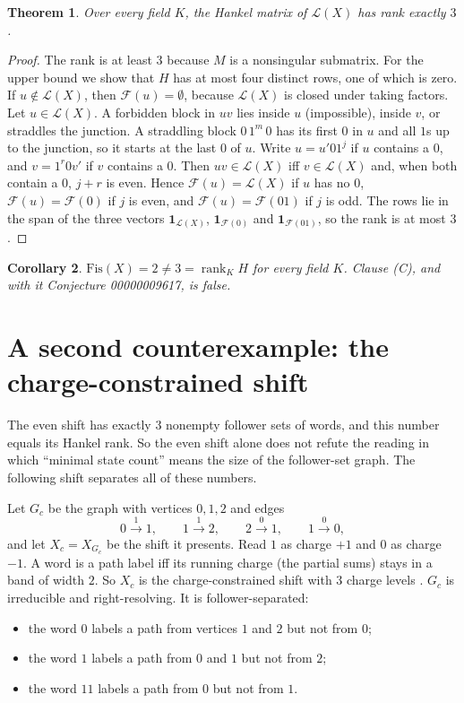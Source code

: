 \documentclass[11pt]{article}
\newtheorem{theorem}{Theorem}
\newtheorem{corollary}[theorem]{Corollary}
\theoremstyle{definition}
\theoremstyle{remark}
\newcommand{\Lang}{\mathcal{L}}
\newcommand{\F}{\mathcal{F}}
\begin{document}
\begin{theorem}\label{thm:rank}
Over every field $K$, the Hankel matrix of $\Lang(X)$ has rank exactly $3$.
\end{theorem}
\begin{proof}
The rank is at least $3$ because $M$ is a nonsingular submatrix. For the
upper bound we show that $H$ has at most four distinct rows, one of which is
zero. If $u\notin\Lang(X)$, then $\F(u)=\emptyset$, because $\Lang(X)$ is
closed under taking factors. Let $u\in\Lang(X)$. A forbidden block in $uv$ lies
inside $u$ (impossible), inside $v$, or straddles the junction. A straddling
block $0\,1^m\,0$ has its first $0$ in $u$ and all $1$s up to the junction, so
it starts at the last $0$ of $u$. Write $u=u'01^j$ if $u$ contains a $0$, and
$v=1^r0v'$ if $v$ contains a $0$. Then $uv\in\Lang(X)$ iff $v\in\Lang(X)$ and,
when both contain a $0$, $j+r$ is even. Hence $\F(u)=\Lang(X)$ if $u$ has no
$0$, $\F(u)=\F(0)$ if $j$ is even, and $\F(u)=\F(01)$ if $j$ is odd. The rows
lie in the span of the three vectors $\mathbf 1_{\Lang(X)}$, $\mathbf 1_{\F(0)}$
and $\mathbf 1_{\F(01)}$, so the rank is at most $3$.
\end{proof}

\begin{corollary}
$\mathrm{Fis}(X)=2\ne 3=\operatorname{rank}_K H$ for every field $K$. Clause (C), and
with it Conjecture 00000009617, is false.
\end{corollary}

\section{A second counterexample: the charge-constrained shift}

The even shift has exactly $3$ nonempty follower sets of words, and this
number equals its Hankel rank. So the even shift alone does not refute the
reading in which ``minimal state count'' means the size of the follower-set
graph. The following shift separates all of these numbers.

Let $G_c$ be the graph with vertices $0,1,2$ and edges
\[
0\xrightarrow{1}1,\qquad 1\xrightarrow{1}2,\qquad 2\xrightarrow{0}1,\qquad 1\xrightarrow{0}0,
\]
and let $X_c=X_{G_c}$ be the shift it presents. Read $1$ as charge $+1$ and $0$ as charge $-1$.
A word is a path label iff its running charge (the partial sums) stays in a band of width $2$.
So $X_c$ is the charge-constrained shift with $3$ charge levels
\cite[Ex.~1.2.7]{lm}. $G_c$ is irreducible and right-resolving. It is
follower-separated:
\begin{itemize}
\item the word $0$ labels a path from vertices $1$ and $2$ but not from $0$;
\item the word $1$ labels a path from $0$ and $1$ but not from $2$;
\item the word $11$ labels a path from $0$ but not from $1$.
\end{itemize}
\end{document}
